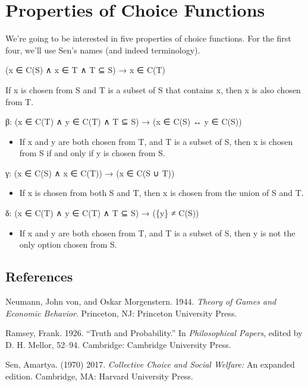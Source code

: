 \documentclass[
  12pt,
  letterpaper,
  DIV=11,
  numbers=noendperiod]{scrartcl}
\newlength{\cslhangindent}
\newenvironment{CSLReferences}[2] %
 {\begin{list}{}{%
  \setlength{\itemindent}{0pt}
  \setlength{\leftmargin}{0pt}
  \setlength{\parsep}{0pt}
  \ifodd #1
   \setlength{\leftmargin}{\cslhangindent}
   \setlength{\itemindent}{-1\cslhangindent}
  \fi
  \setlength{\itemsep}{#2\baselineskip}}}
 {\end{list}}
\providecommand{\tightlist}{%
  \setlength{\itemsep}{0pt}\setlength{\parskip}{0pt}}
\begin{document}
\section{Properties of Choice
Functions}\label{properties-of-choice-functions}

We're going to be interested in five properties of choice functions. For
the first four, we'll use Sen's names (and indeed terminology).

\begin{description}
\tightlist
\item[Property α]
(x ∈ C(S) ∧ x ∈ T ∧ T ⊆ S) → x ∈ C(T)

If x is chosen from S and T is a subset of S that contains x, then x is
also chosen from T.
\end{description}

β: (x ∈ C(T) ∧ y ∈ C(T) ∧ T ⊆ S) → (x ∈ C(S) ↔ y ∈ C(S))

\begin{itemize}
\tightlist
\item
  If x and y are both chosen from T, and T is a subset of S, then x is
  chosen from S if and only if y is chosen from S.
\end{itemize}

γ: (x ∈ C(S) ∧ x ∈ C(T)) → (x ∈ C(S ∪ T))

\begin{itemize}
\tightlist
\item
  If x is chosen from both S and T, then x is chosen from the union of S
  and T.
\end{itemize}

δ: (x ∈ C(T) ∧ y ∈ C(T) ∧ T ⊆ S) → (\{y\} ≠ C(S))

\begin{itemize}
\tightlist
\item
  If x and y are both chosen from T, and T is a subset of S, then y is
  not the only option chosen from S.
\end{itemize}

\subsection*{References}\label{references}

\label{refs}
\begin{CSLReferences}{1}{0}
Neumann, John von, and Oskar Morgenstern. 1944. \emph{Theory of Games
and Economic Behavior}. Princeton, NJ: Princeton University Press.

Ramsey, Frank. 1926. {``Truth and Probability.''} In \emph{Philosophical
Papers}, edited by D. H. Mellor, 52--94. Cambridge: Cambridge University
Press.

Sen, Amartya. (1970) 2017. \emph{Collective Choice and Social Welfare:}
An expanded edition. Cambridge, MA: Harvard University Press.

\end{CSLReferences}
\end{document}
